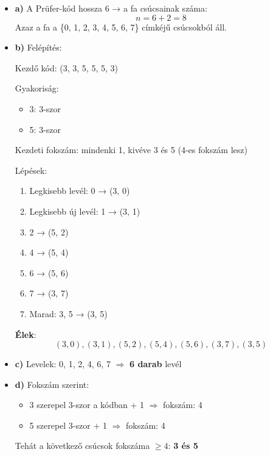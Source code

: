 \begin{solution}
	\begin{itemize}
		\item \textbf{a)} A Prüfer-kód hossza 6 → a fa csúcsainak száma: 
		\[
		n=6+2=8
		\]
		Azaz a fa a \{0, 1, 2, 3, 4, 5, 6, 7\} címkéjű csúcsokból áll.
		\item \textbf{b)} Felépítés:
		
		Kezdő kód: (3, 3, 5, 5, 5, 3)
		
		Gyakoriság: 
		\begin{itemize}
			\item 3: 3-szor 
			\item 5: 3-szor 
		\end{itemize}
		Kezdeti fokszám: mindenki 1, kivéve 3 és 5 (4-es fokszám lesz)
		
		Lépések: 
		\begin{enumerate}
			\item Legkisebb levél: 0 → (3, 0) 
			\item Legkisebb új levél: 1 → (3, 1) 
			\item 2 → (5, 2) 
			\item 4 → (5, 4) 
			\item 6 → (5, 6) 
			\item 7 → (3, 7) 
			\item Marad: 3, 5 → (3, 5) 
		\end{enumerate}
		\textbf{Élek}: 
		\[
		(3,0),(3,1),(5,2),(5,4),(5,6),(3,7),(3,5)
		\]
		
		\item \textbf{c)} Levelek: 0, 1, 2, 4, 6, 7 \ensuremath{\Rightarrow} \textbf{6
			darab} levél
		\item \textbf{d)} Fokszám szerint: 
		\begin{itemize}
			\item 3 szerepel 3-szor a kódban + 1 \ensuremath{\Rightarrow} fokszám: 4 
			\item 5 szerepel 3-szor + 1 \ensuremath{\Rightarrow} fokszám: 4 
		\end{itemize}
		Tehát a következő csúcsok fokszáma $\geq4$: \textbf{3 és 5} 
	\end{itemize}
\end{solution}